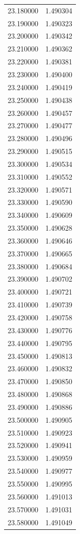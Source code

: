 \begin{tabular}{rr}
23.180000 & 1.490304 \\
23.190000 & 1.490323 \\
23.200000 & 1.490342 \\
23.210000 & 1.490362 \\
23.220000 & 1.490381 \\
23.230000 & 1.490400 \\
23.240000 & 1.490419 \\
23.250000 & 1.490438 \\
23.260000 & 1.490457 \\
23.270000 & 1.490477 \\
23.280000 & 1.490496 \\
23.290000 & 1.490515 \\
23.300000 & 1.490534 \\
23.310000 & 1.490552 \\
23.320000 & 1.490571 \\
23.330000 & 1.490590 \\
23.340000 & 1.490609 \\
23.350000 & 1.490628 \\
23.360000 & 1.490646 \\
23.370000 & 1.490665 \\
23.380000 & 1.490684 \\
23.390000 & 1.490702 \\
23.400000 & 1.490721 \\
23.410000 & 1.490739 \\
23.420000 & 1.490758 \\
23.430000 & 1.490776 \\
23.440000 & 1.490795 \\
23.450000 & 1.490813 \\
23.460000 & 1.490832 \\
23.470000 & 1.490850 \\
23.480000 & 1.490868 \\
23.490000 & 1.490886 \\
23.500000 & 1.490905 \\
23.510000 & 1.490923 \\
23.520000 & 1.490941 \\
23.530000 & 1.490959 \\
23.540000 & 1.490977 \\
23.550000 & 1.490995 \\
23.560000 & 1.491013 \\
23.570000 & 1.491031 \\
23.580000 & 1.491049 \\

\end{tabular}
